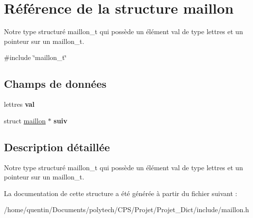 \hypertarget{structmaillon}{\section{Référence de la structure maillon}
\label{structmaillon}
}


Notre type structuré maillon\-\_\-t qui possède un élément val de type lettres et un pointeur sur un maillon\-\_\-t.  




{\ttfamily \#include \char`\"{}maillon\-\_\-t\char`\"{}}

\subsection*{Champs de données}
\begin{DoxyCompactItemize}
\item 
\hypertarget{structmaillon_a073d7241d7240eb7f837b4f42bf81672}{lettres {\bfseries val}}\label{structmaillon_a073d7241d7240eb7f837b4f42bf81672}

\item 
\hypertarget{structmaillon_acb60bd6a2690c6383dca705b5be9e761}{struct \hyperlink{structmaillon}{maillon} $\ast$ {\bfseries suiv}}\label{structmaillon_acb60bd6a2690c6383dca705b5be9e761}

\end{DoxyCompactItemize}


\subsection{Description détaillée}
Notre type structuré maillon\-\_\-t qui possède un élément val de type lettres et un pointeur sur un maillon\-\_\-t. 

La documentation de cette structure a été générée à partir du fichier suivant \-:\begin{DoxyCompactItemize}
\item 
/home/quentin/\-Documents/polytech/\-C\-P\-S/\-Projet/\-Projet\-\_\-\-Dict/include/maillon.\-h\end{DoxyCompactItemize}
